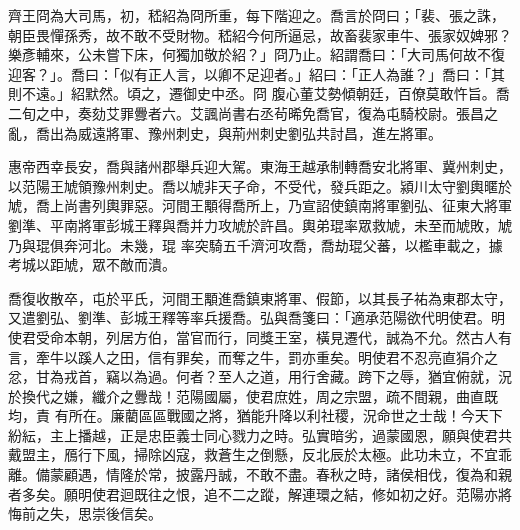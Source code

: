 \begin{pinyinscope}
 齊王冏為大司馬，初，嵇紹為冏所重，每下階迎之。喬言於冏曰；「裴、張之誅，朝臣畏憚孫秀，故不敢不受財物。嵇紹今何所逼忌，故畜裴家車牛、張家奴婢邪？樂彥輔來，公未嘗下床，何獨加敬於紹？」冏乃止。紹謂喬曰：「大司馬何故不復迎客？」。喬曰：「似有正人言，以卿不足迎者。」紹曰：「正人為誰？」喬曰：「其則不遠。」紹默然。頃之，遷御史中丞。冏
 腹心董艾勢傾朝廷，百僚莫敢忤旨。喬二旬之中，奏劾艾罪釁者六。艾諷尚書右丞茍晞免喬官，復為屯騎校尉。張昌之亂，喬出為威遠將軍、豫州刺史，與荊州刺史劉弘共討昌，進左將軍。



 惠帝西幸長安，喬與諸州郡舉兵迎大駕。東海王越承制轉喬安北將軍、冀州刺史，以范陽王虓領豫州刺史。喬以虓非天子命，不受代，發兵距之。潁川太守劉輿暱於虓，喬上尚書列輿罪惡。河間王顒得喬所上，乃宣詔使鎮南將軍劉弘、征東大將軍劉準、平南將軍彭城王釋與喬并力攻虓於許昌。輿弟琨率眾救虓，未至而虓敗，虓乃與琨俱奔河北。未幾，琨
 率突騎五千濟河攻喬，喬劫琨父蕃，以檻車載之，據考城以距虓，眾不敵而潰。



 喬復收散卒，屯於平氏，河間王顒進喬鎮東將軍、假節，以其長子祐為東郡太守，又遣劉弘、劉準、彭城王釋等率兵援喬。弘與喬箋曰：「適承范陽欲代明使君。明使君受命本朝，列居方伯，當官而行，同獎王室，橫見遷代，誠為不允。然古人有言，牽牛以蹊人之田，信有罪矣，而奪之牛，罰亦重矣。明使君不忍亮直狷介之忿，甘為戎首，竊以為過。何者？至人之道，用行舍藏。跨下之辱，猶宜俯就，況於換代之嫌，纖介之釁哉！范陽國屬，使君庶姓，周之宗盟，疏不間親，曲直既均，責
 有所在。廉藺區區戰國之將，猶能升降以利社稷，況命世之士哉！今天下紛紜，主上播越，正是忠臣義士同心戮力之時。弘實暗劣，過蒙國恩，願與使君共戴盟主，鴈行下風，掃除凶寇，救蒼生之倒懸，反北辰於太極。此功未立，不宜乖離。備蒙顧遇，情隆於常，披露丹誠，不敢不盡。春秋之時，諸侯相伐，復為和親者多矣。願明使君迴既往之恨，追不二之蹤，解連環之結，修如初之好。范陽亦將悔前之失，思崇後信矣。




\end{pinyinscope}
